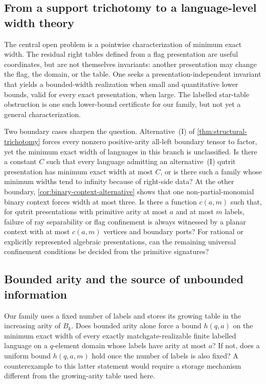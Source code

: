 \documentclass[11pt]{article}
\theoremstyle{definition}
\theoremstyle{remark}
\begin{document}
\subsection{From a support trichotomy to a language-level width theory}

The central open problem is a pointwise characterization of minimum exact
width.  The residual right tables defined from a flag presentation are useful
coordinates, but are not themselves invariants: another presentation may
change the flag, the domain, or the table.  One seeks a
presentation-independent invariant that yields a bounded-width realization
when small and quantitative lower bounds, valid for every exact presentation,
when large.  The labelled star-table obstruction is one such lower-bound
certificate for our family, but not yet a general characterization.

Two boundary cases sharpen the question.  Alternative~\textup{(I)} of
\cref{thm:structural-trichotomy} forces every nonzero positive-arity all-left
boundary tensor to factor, yet the minimum exact width of languages in this
branch is unclassified.  Is there a constant $C$ such that every language
admitting an alternative~\textup{(I)} qutrit presentation has minimum exact
width at most $C$, or is there such a family whose minimum widths tend to
infinity because of right-side data?  At the other boundary,
\cref{cor:binary-context-alternative} shows that one non-partial-monomial
binary context forces width at most three.  Is there a function $c(a,m)$ such
that, for qutrit presentations with primitive arity at most $a$ and at most
$m$ labels, failure of ray separability or flag confinement is always
witnessed by a planar context with at most $c(a,m)$ vertices and boundary
ports?  For rational or explicitly represented algebraic presentations, can
the remaining universal confinement conditions be decided from the primitive
signatures?

\subsection{Bounded arity and the source of unbounded information}

Our family uses a fixed number of labels and stores its growing table in the
increasing arity of $B_k$.  Does bounded arity alone force a bound $h(q,a)$ on
the minimum exact width of every exactly matchgate-realizable finite labelled
language on a $q$-element domain whose labels have arity at most $a$?  If not,
does a uniform bound $h(q,a,m)$ hold once the number of labels is also fixed?
A counterexample to this latter statement would require a storage mechanism
different from the growing-arity table used here.
\end{document}
